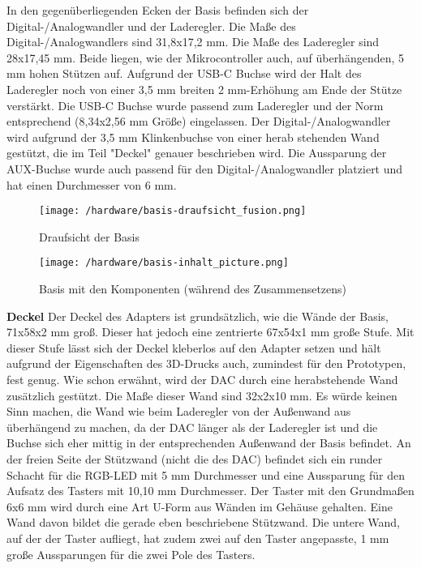 \documentclass[11pt, twoside]{article}
\begin{document}
In den gegenüberliegenden Ecken der Basis befinden sich der Digital-/Analogwandler und der Laderegler. Die Maße des Digital-/Analogwandlers sind 31,8x17,2 mm. Die Maße des Laderegler sind 28x17,45 mm. Beide liegen, wie der Mikrocontroller auch, auf überhängenden, 5 mm hohen Stützen auf. Aufgrund der USB-C Buchse wird der Halt des Laderegler noch von einer 3,5 mm breiten 2 mm-Erhöhung am Ende der Stütze verstärkt. Die USB-C Buchse wurde passend zum Laderegler und der Norm entsprechend (8,34x2,56 mm Größe) eingelassen. Der Digital-/Analogwandler wird aufgrund der 3,5 mm Klinkenbuchse von einer herab stehenden Wand gestützt, die im Teil "Deckel" genauer beschrieben wird. Die Aussparung der AUX-Buchse wurde auch passend für den Digital-/Analogwandler platziert und hat einen Durchmesser von 6 mm.\newline
\begin{figure}[H]
	\texttt{[image: /hardware/basis-draufsicht\_fusion.png]}
	\caption{Draufsicht der Basis}
\end{figure}
\begin{figure}[H]
	\texttt{[image: /hardware/basis-inhalt\_picture.png]}
	\caption{Basis mit den Komponenten (während des Zusammensetzens)}
\end{figure}
\noindent \textbf{Deckel} \newline
Der Deckel des Adapters ist grundsätzlich, wie die Wände der Basis, 71x58x2 mm groß. Dieser hat jedoch eine zentrierte 67x54x1 mm große Stufe. Mit dieser Stufe lässt sich der Deckel kleberlos auf den Adapter setzen und hält aufgrund der Eigenschaften des 3D-Drucks auch, zumindest für den Prototypen, fest genug.
Wie schon erwähnt, wird der DAC durch eine herabstehende Wand zusätzlich gestützt. Die Maße dieser Wand sind 32x2x10 mm. Es würde keinen Sinn machen, die Wand wie beim Laderegler von der Außenwand aus überhängend zu machen, da der DAC länger als der Laderegler ist und die Buchse sich eher mittig in der entsprechenden Außenwand der Basis befindet.\newline
An der freien Seite der Stützwand (nicht die des DAC) befindet sich ein runder Schacht für die RGB-LED mit 5 mm Durchmesser und eine Aussparung für den Aufsatz des Tasters mit 10,10 mm Durchmesser. Der Taster mit den Grundmaßen 6x6 mm wird durch eine Art U-Form aus Wänden im Gehäuse gehalten. Eine Wand davon bildet die gerade eben beschriebene Stützwand. Die untere Wand, auf der der Taster aufliegt, hat zudem zwei auf den Taster angepasste, 1 mm große Aussparungen für die zwei Pole des Tasters.\newline
\end{document}
